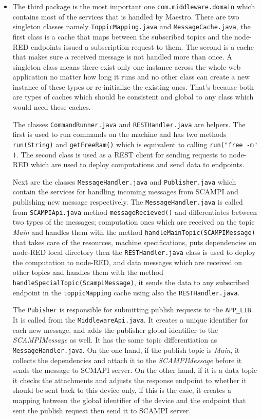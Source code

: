 \begin{itemize}
 
 \item The third package is the most important one \verb|com.middleware.domain| which contains most of the services that is handled by Maestro. There are two singleton classes namely \verb|ToppicMapping.java| and \verb|MessageCache.java|, the first class is a cache that maps between the subscribed topics and the node-RED endpoints issued a subscription request to them. The second is a cache that makes sure a received message is not handled more than once. A singleton class means there exist only one instance across the whole web application no matter how long it runs and no other class can create a new instance of these types or re-initialize the existing ones. That's because both are types of caches which should be consistent and global to any class which would need these caches. 
 
 The classes \verb|CommandRunner.java| and \verb|RESTHandler.java| are helpers. The first is used to run commands on the machine and  has two methods \verb|run(String)| and \verb|getFreeRam()| which is equivalent to calling \verb|run("free -m" )|. The second class is used as a REST client for sending requests to node-RED which are used to deploy computations and  send data to endpoints.
 
  Next are the classes \verb|MessageHandler.java| and \verb|Publisher.java| which contain the services for handling incoming messages from SCAMPI and publishing new message respectively. The \verb|MessageHandler.java| is called from  \verb|SCAMPIApi.java| method \verb|messageRecieved()| and differentiates between two types of the messages; computation ones which are received on the topic \textit{Main} and handles them with the method \verb|handleMainTopic(SCAMPIMessage)| that takes care of the resources, machine specifications, puts dependencies on node-RED local directory then the \verb|RESTHandler.java| class is used to deploy the computation to node-RED, and data messages which are received on other topics and handles them with the method \verb|handleSpecialTopic(ScampiMessage)|, it sends the data to any subscribed endpoint in the \verb|toppicMapping| cache using also the \verb|RESTHandler.java|.
 
 The \verb|Pubisher| is responsible for submitting publish requests to the \verb|APP_LIB|. It is called from the \verb|MiddlewareApi.java|.  It creates a unique identifier for each new message, and adds the publisher global identifier to the \textit{SCAMPIMessage} as well. It has the same topic differentiation as \verb|MessageHandler.java|.
 On the one hand, if the publish topic is \textit{Main}, it collects the dependencies and attach it to the \textit{SCAMPIMessage} before it sends the message to SCMAPI server. On the other hand, if it is a data topic it checks the attachments and adjusts the response endpoint  to whether it should be sent back to this device only, if this is the case, it creates a mapping between the global identifier of the device and the endpoint that sent the publish request then send it to SCAMPI server. \\
 

\end{itemize}
